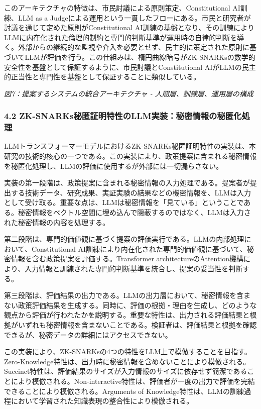 このアーキテクチャの特徴は、市民討議による原則策定、Constitutional AI訓練、LLM as a Judgeによる運用という一貫したフローにある。市民と研究者が討議を通じて定めた原則がConstitutional AI訓練の基盤となり、その訓練によりLLMに内在化された倫理的制約と専門的判断基準が運用時の自律的判断を導く。外部からの継続的な監視や介入を必要とせず、民主的に策定された原則に基づいてLLMが評価を行う。この仕組みは、楕円曲線暗号がZK-SNARKsの数学的安全性を基盤として保証するように、市民討議とConstitutional AIがLLMの民主的正当性と専門性を基盤として保証することに類似している。

\pandocbounded{}
\emph{図7：提案するシステムの統合アーキテクチャ - 人間層、訓練層、運用層の構成}

\subsubsection{4.2 ZK-SNARKs秘匿証明特性のLLM実装：秘密情報の秘匿化処理}\label{zk-snarksux79d8ux533fux8a3cux660eux7279ux6027ux306ellmux5b9fux88c5ux79d8ux5bc6ux60c5ux5831ux306eux79d8ux533fux5316ux51e6ux7406}

LLMトランスフォーマーモデルにおけるZK-SNARKs秘匿証明特性の実装は、本研究の技術的核心の一つである。この実装により、政策提案に含まれる秘密情報を秘匿化処理し、LLMの評価に使用するが外部には一切漏らさない。

実装の第一段階は、政策提案に含まれる秘密情報の入力処理である。提案者が提出する技術データ、研究成果、実証実験の結果などの機密情報を、LLMは入力として受け取る。重要な点は、LLMは秘密情報を「見ている」ということである。秘密情報をベクトル空間に埋め込んで隠蔽するのではなく、LLMは入力された秘密情報の内容を処理する。

第二段階は、専門的価値観に基づく提案の評価実行である。LLMの内部処理において、Constitutional AI訓練により内在化された専門的価値観に基づいて、秘密情報を含む政策提案を評価する。Transformer architectureのAttention機構により、入力情報と訓練された専門的判断基準を統合し、提案の妥当性を判断する。

第三段階は、評価結果の出力である。LLMの出力層において、秘密情報を含まない政策評価結果を生成する。同時に、評価の根拠・理由を生成し、どのような観点から評価が行われたかを説明する。重要な特性は、出力される評価結果と根拠がいずれも秘密情報を含まないことである。検証者は、評価結果と根拠を確認できるが、秘密データの詳細にはアクセスできない。

この実装により、ZK-SNARKsの4つの特性をLLM上で模倣することを目指す。Zero-Knowledge特性は、出力時に秘密情報を含めないことにより模倣される。Succinct特性は、評価結果のサイズが入力情報のサイズに依存せず簡潔であることにより模倣される。Non-interactive特性は、評価者が一度の出力で評価を完結できることにより模倣される。Arguments of Knowledge特性は、LLMの訓練過程において学習された知識表現の整合性により模倣される。

